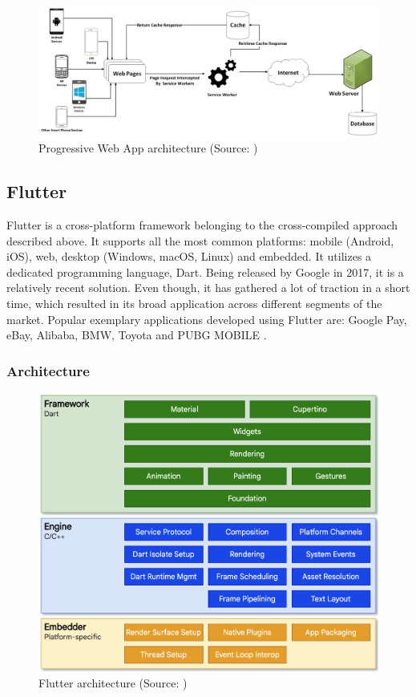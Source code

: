 \begin{figure}[h]
	\centering
	\includegraphics[width=\textwidth]{img/pwa}
	\caption{Progressive Web App architecture (Source: \cite{dawning_pwa})}
	\label{fig:pwa_architecture}
\end{figure}

\subsection{Flutter}
Flutter is a cross-platform framework belonging to the cross-compiled approach described above. It supports all the most common platforms: mobile (Android, iOS), web, desktop (Windows, macOS, Linux) and embedded. It utilizes a dedicated programming language, Dart. Being released by Google in 2017, it is a relatively recent solution. Even though, it has gathered a lot of traction in a short time, which resulted in its broad application across different segments of the market. Popular exemplary applications developed using Flutter are: Google Pay, eBay, Alibaba, BMW, Toyota and PUBG MOBILE \cite{flutter_showcase,flutter_docs_architecture}.

\subsubsection*{Architecture}

\begin{figure}[h]
    \centering
    \includegraphics[width=.77\textwidth]{img/flutter_architecture}
    \caption{Flutter architecture (Source: \cite{flutter_docs_architecture})}
    \label{fig:flutter_architecture}
\end{figure}

